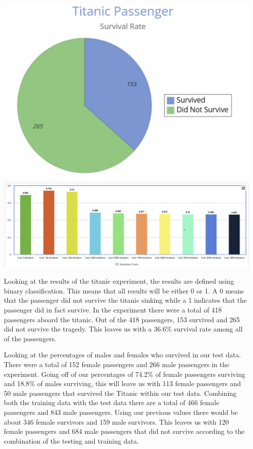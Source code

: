 \documentclass{IEEE}
\begin{document}
\includegraphics[scale=0.535]{./piechart.png}
\\ \includegraphics[scale=0.32]{./barchart.png}

Looking at the results of the titanic experiment, the results are defined using binary classification. This means that all results will be either 0 or 1. A 0 means that the passenger did not survive the titanic sinking while a 1 indicates that the passenger did in fact survive. In the experiment there were a total of 418 passengers aboard the titanic. Out of the 418 passengers, 153 survived and 265 did not survive the tragedy. This leaves us with a 36.6\% survival rate among all of the passengers.

Looking at the percentages of males and females who survived in our test data. There were a total of 152 female passengers and 266 male passengers in the experiment. Going off of our percentages of 74.2\% of female passengers surviving and 18.8\% of males surviving, this will leave us with 113 female passengers and 50 male passengers that survived the Titanic within our test data. Combining both the training data with the test data there are a total of 466 female passengers and 843 male passengers. Using our previous values there would be about 346 female survivors and 159 male survivors. This leaves us with 120 female passengers and 684 male passengers that did not survive according to the combination of the testing and training data.
\end{document}
